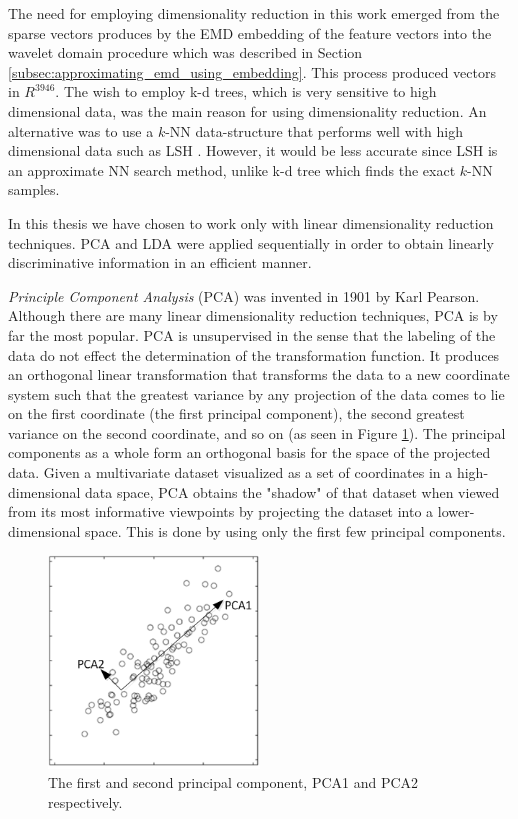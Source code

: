 \iftoggle{edit-mode}{\hspace{0pt}\marginpar{Why do we need DR?}}{}
The need for employing dimensionality reduction in this work emerged from the sparse vectors produces by the EMD embedding of the feature vectors into the wavelet domain procedure which was described in Section \ref{subsec:approximating_emd_using_embedding}. This process produced vectors in $R^{3946}$. The wish to employ k-d trees, which is very sensitive to high dimensional data, was the main reason for using dimensionality reduction. An alternative was to use a $k$-NN data-structure that performs well with high dimensional data such as LSH \cite{gionis1999similarity}. However, it would be less accurate since LSH is an approximate NN search method, unlike k-d tree which finds the exact $k$-NN samples.

\iftoggle{edit-mode}{\hspace{0pt}\marginpar{What DR we use?}}{}
In this thesis we have chosen to work only with linear dimensionality reduction techniques. PCA and LDA were applied sequentially in order to obtain linearly discriminative information in an efficient manner.

\iftoggle{edit-mode}{\hspace{0pt}\marginpar{PCA}}{}
\emph{Principle Component Analysis} (PCA) was invented in 1901 by Karl Pearson. Although there are many linear dimensionality reduction techniques, PCA is by far the most popular. PCA is unsupervised in the sense that the labeling of the data do not effect the determination of the transformation function. It produces an orthogonal linear transformation that transforms the data to a new coordinate system such that the greatest variance by any projection of the data comes to lie on the first coordinate (the first principal component), the second greatest variance on the second coordinate, and so on (as seen in Figure \ref{fig:pca_demo}). The principal components as a whole form an orthogonal basis for the space of the projected data. Given a multivariate dataset visualized as a set of coordinates in a high-dimensional data space, PCA obtains the "shadow" of that dataset when viewed from its most informative viewpoints by projecting the dataset into a lower-dimensional space. This is done by using only the first few principal components.

\begin{figure}
\centering
\includegraphics[width=0.5\textwidth]{./figures/pca_demo}       
\caption{The first and second principal component, PCA1 and PCA2 respectively.}
\label{fig:pca_demo}
\end{figure}

